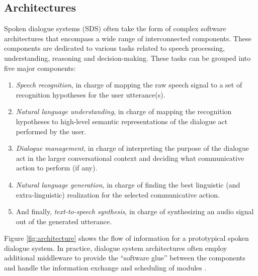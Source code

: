  \subsection{Architectures}
\label{sec:architectures}

Spoken dialogue systems (SDS) often take the form of complex software architectures that encompass a wide range of interconnected components. These components are dedicated to various tasks related to speech processing, understanding, reasoning and decision-making. These tasks can be grouped into five major components: 
\begin{enumerate}
\item \textit{Speech recognition}, in charge of mapping the raw speech signal to a set of recognition hypotheses for the user utterance(s).
\item \textit{Natural language understanding}, in charge of mapping the recognition hypotheses to high-level semantic representations of the dialogue act performed by the user.
\item \textit{Dialogue management}, in charge of interpreting the purpose of the dialogue act in the larger conversational context and deciding what communicative action to perform (if any).
\item \textit{Natural language generation}, in charge of finding the best linguistic (and extra-linguistic) realization for the selected communicative action.
\item And finally, \textit{text-to-speech synthesis}, in charge of synthesizing an audio signal out of the generated utterance.
 \end{enumerate}
 
 Figure \ref{fig:architecture} shows the flow of information for a prototypical spoken dialogue system. In practice, dialogue system architectures often employ additional middleware to provide the ``software glue'' between the components and handle the information exchange and scheduling of modules \citep{jaspis2004,Herzog:2004,Bohus:2009,schlangen2010}.
   
